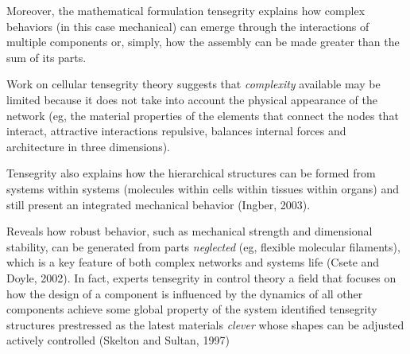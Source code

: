     Moreover, the mathematical formulation tensegrity explains how complex behaviors (in this case mechanical) can emerge through the interactions of multiple components or, simply, how the assembly can be made greater than the sum of its parts.

    Work on cellular tensegrity theory suggests that \emph{complexity} available may be limited because it does not take into account the physical appearance of the network (eg, the material properties of the elements that connect the nodes that interact, attractive interactions repulsive, balances internal forces and architecture in three dimensions).

    Tensegrity also explains how the hierarchical structures can be formed from systems within systems (molecules within cells within tissues within organs) and still present an integrated mechanical behavior (Ingber, 2003).

    Reveals how robust behavior, such as mechanical strength and dimensional stability, can be generated from parts \emph {neglected} (eg, flexible molecular filaments), which is a key feature of both complex networks and systems life (Csete and Doyle, 2002). In fact, experts tensegrity in control theory a field that focuses on how the design of a component is influenced by the dynamics of all other components achieve some global property of the system  identified tensegrity structures prestressed as the latest materials \emph{clever} whose shapes can be adjusted actively controlled (Skelton and Sultan, 1997)
